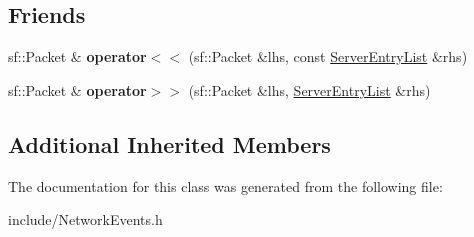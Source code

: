 \subsection*{Friends}
\begin{DoxyCompactItemize}
\item 
\hypertarget{class_server_entry_list_a2fab4a51441a6a5006735424f9d6104f}{sf\-::\-Packet \& {\bfseries operator$<$$<$} (sf\-::\-Packet \&lhs, const \hyperlink{class_server_entry_list}{Server\-Entry\-List} \&rhs)}\label{class_server_entry_list_a2fab4a51441a6a5006735424f9d6104f}

\item 
\hypertarget{class_server_entry_list_adc41cb94c3337543bb9e1845fac0ba61}{sf\-::\-Packet \& {\bfseries operator$>$$>$} (sf\-::\-Packet \&lhs, \hyperlink{class_server_entry_list}{Server\-Entry\-List} \&rhs)}\label{class_server_entry_list_adc41cb94c3337543bb9e1845fac0ba61}

\end{DoxyCompactItemize}
\subsection*{Additional Inherited Members}


The documentation for this class was generated from the following file\-:\begin{DoxyCompactItemize}
\item 
include/Network\-Events.\-h\end{DoxyCompactItemize}
